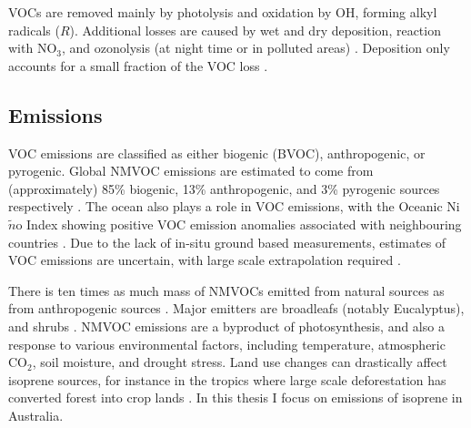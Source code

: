   VOCs are removed mainly by photolysis and oxidation by OH, forming alkyl 
  radicals ($R\dot{}$).
  Additional losses are caused by wet and dry deposition, reaction with NO$_3$, and ozonolysis (at night time or in polluted areas) \parencite{AtkinsonArey2003, Brown2009}.
  Deposition only accounts for a small fraction of the VOC loss 
  \parencite{AtkinsonArey2003}.
  
  
  \subsection{Emissions}
    \label{LR:VOCs:Emissions}
    
    VOC emissions are classified as either biogenic (BVOC), anthropogenic, or pyrogenic.
    Global NMVOC emissions are estimated to come from (approximately) 85\% biogenic, 13\% 
    anthropogenic, and 3\% pyrogenic sources respectively 
    \parencite{Kanakidou2005, Kefauver2014}.
    The ocean also plays a role in VOC emissions, with the Oceanic 
    Ni$\tilde{n}$o Index showing positive VOC emission anomalies associated 
    with neighbouring countries \parencite{Stavrakou2014}.
    Due to the lack of in-situ ground based measurements, estimates of VOC 
    emissions are uncertain, with large scale extrapolation required 
    \parencite{Millet2006}.
    
    
    There is ten times as much mass of NMVOCs emitted from natural sources as 
    from anthropogenic sources \parencite{Guenther2006, Kanakidou2005, 
    Millet2006}.
    Major emitters are broadleafs (notably Eucalyptus), and shrubs \parencite{Guenther2006, Arneth2008, Niinemets2010, Monks2015}.
    NMVOC emissions are a byproduct of photosynthesis, and also a response to 
    various environmental factors, including temperature, atmospheric CO$_2$, 
    soil moisture, and drought stress.
    Land use changes can drastically affect isoprene sources, for instance in the tropics where large scale deforestation has converted forest into crop lands \parencite{Kanakidou2005}.
    In this thesis I focus on emissions of isoprene in Australia.
    
